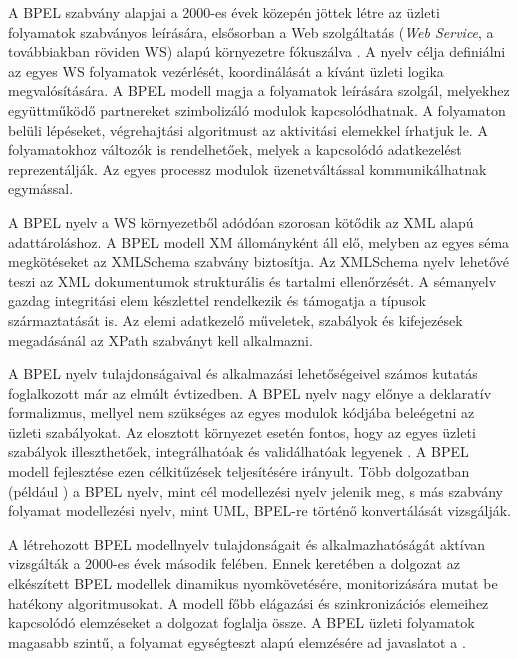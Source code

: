 

A BPEL szabvány alapjai a 2000-es évek közepén jöttek létre az üzleti folyamatok szabványos leírására, elsősorban a Web szolgáltatás (\textit{Web Service}, a továbbiakban röviden WS) alapú környezetre fókuszálva \cite{andrews2003business}. A nyelv célja definiálni az  egyes WS folyamatok vezérlését, koordinálását a kívánt üzleti logika megvalósítására.  A BPEL modell magja  a folyamatok leírására szolgál, melyekhez együttműködő partnereket szimbolizáló modulok kapcsolódhatnak. A folyamaton belüli lépéseket, végrehajtási algoritmust az aktivitási elemekkel írhatjuk le. A folyamatokhoz változók is rendelhetőek, melyek a kapcsolódó adatkezelést reprezentálják. Az egyes processz modulok üzenetváltással kommunikálhatnak egymással.   

A BPEL nyelv a WS környezetből adódóan szorosan kötődik az XML alapú adattároláshoz. A BPEL modell XM állományként áll elő, melyben az egyes séma megkötéseket az XMLSchema szabvány biztosítja. Az XMLSchema nyelv lehetővé teszi az XML dokumentumok strukturális és tartalmi ellenőrzését. A sémanyelv  gazdag integritási elem készlettel rendelkezik és támogatja a típusok származtatását is. Az elemi adatkezelő műveletek, szabályok és kifejezések megadásánál az XPath szabványt kell alkalmazni.  

A BPEL nyelv tulajdonságaival és alkalmazási lehetőségeivel számos kutatás foglalkozott már az elmúlt évtizedben. A BPEL nyelv nagy előnye a deklaratív formalizmus, mellyel nem szükséges  az egyes modulok kódjába beleégetni az üzleti szabályokat. Az elosztott környezet esetén fontos, hogy az egyes üzleti szabályok illeszthetőek, integrálhatóak és validálhatóak legyenek \cite{rosenberg2005business}. A BPEL modell fejlesztése ezen célkitűzések teljesítésére irányult. Több dolgozatban (például \cite{ouyang2006translating}) a BPEL nyelv, mint cél modellezési nyelv jelenik meg, s más szabvány folyamat modellezési nyelv, mint UML, BPEL-re történő konvertálását vizsgálják.   

A létrehozott BPEL modellnyelv tulajdonságait és alkalmazhatóságát  aktívan vizsgálták a 2000-es évek második felében. Ennek keretében a \cite{baresi2005towards} dolgozat az elkészített BPEL modellek dinamikus nyomkövetésére, monitorizására mutat be hatékony algoritmusokat. A modell főbb elágazási és szinkronizációs elemeihez kapcsolódó elemzéseket a \cite{ouyang2005wofbpel} dolgozat foglalja össze. A BPEL üzleti folyamatok magasabb szintű, a folyamat egységteszt alapú elemzésére ad javaslatot a \cite{mayer2006towards}.


